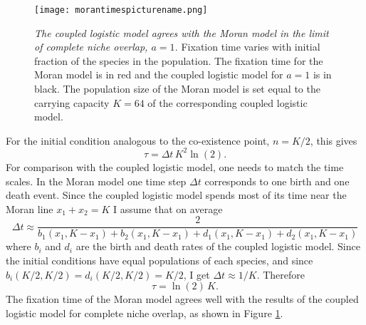 \begin{figure}[ht]
	\centering
	\texttt{[image: morantimespicturename.png]}
	\caption{\emph{The coupled logistic model agrees with the Moran model in the limit of complete niche overlap, $a=1$.}  Fixation time varies with initial fraction of the species in the population. The fixation time for the Moran model is in red and the coupled logistic model for $a=1$ is in black. The population size of the Moran model is set equal to the carrying capacity $K=64$ of the corresponding coupled logistic model. 
	} \label{ICfig}
\end{figure}

For the initial condition analogous to the co-existence point, $n = K/2$, this gives
\begin{equation*}
\tau = \Delta t\,K^2\ln\left(2\right).
\end{equation*}
For comparison with the coupled logistic model, one needs to match the time scales. In the Moran model one time step $\Delta t$ corresponds to one birth and one death event. 
Since the coupled logistic model spends most of its time near the Moran line $x_1+x_2=K$ I assume that on average
\begin{equation}
\Delta t \approx \frac{2}{b_1\left(x_1,K-x_1\right)+b_2\left(x_1,K-x_1\right)+d_1\left(x_1,K-x_1\right)+d_2\left(x_1,K-x_1\right)}
\end{equation}
where $b_i$ and $d_i$ are the birth and death rates of the coupled logistic model.
Since the initial conditions have equal populations of each species, and since $b_i\left(K/2,K/2\right)=d_i\left(K/2,K/2\right)=K/2$, I get $\Delta t \approx 1/K$.
Therefore
\begin{equation}
\tau = \ln(2)\, K. \label{morantime}
\end{equation}
The fixation time of the Moran model agrees well with the results of the coupled logistic model for complete niche overlap, as shown in Figure \ref{ICfig}. 




